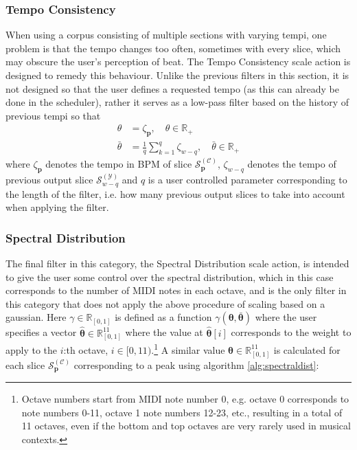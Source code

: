 \subsubsection{Tempo Consistency}
When using a corpus consisting of multiple sections with varying tempi, one problem is that the tempo changes too often, sometimes with every slice, which may obscure the user's perception of beat. The Tempo Consistency scale action is designed to remedy this behaviour. Unlike the previous filters in this section, it is not designed so that the user defines a requested tempo (as this can already be done in the scheduler), rather it serves as a low-pass filter based on the history of previous tempi so that
	\begin{align}
		\theta &= \zeta_{\bm p}, \quad \theta \in \mathbb R_+ \\
		\bar{\theta} &= \frac{1}{q}\sum_{k=1}^q \zeta_{w-q}, \quad \bar{\theta} \in \mathbb R_+
	\end{align} 
	where $\zeta_{\bm p}$ denotes the tempo in BPM of slice $\mathcal S^{(\mathcal C)}_{\bm p}$, $\zeta_{w-q}$ denotes the tempo of previous output slice $\mathcal S^{(\mathcal Y)}_{w-q}$ and $q$ is a user controlled parameter corresponding to the length of the filter, i.e. how many previous output slices to take into account when applying the filter. 

\subsubsection{Spectral Distribution}
The final filter in this category, the Spectral Distribution scale action, is intended to give the user some control over the spectral distribution, which in this case corresponds to the number of MIDI notes in each octave, and is the only filter in this category that does not apply the above procedure of scaling based on a gaussian. Here $\gamma \in \mathbb R_{[0,1]}$ is defined as a function $\gamma \left( \bm{\theta}, \bm{\bar \theta}\right)$ where the user specifies a vector $\bm{\hat \theta} \in \mathbb R^{11}_{[0,1]}$ where the value at $\bm{\hat\theta}[i]$ corresponds to the weight to apply to the $i$:th octave, $i \in [0, 11)$.\footnote{Octave numbers start from MIDI note number 0, e.g. octave 0 corresponds to note numbers 0-11, octave 1 note numbers 12-23, etc., resulting in a total of 11 octaves, even if the bottom and top octaves are very rarely used in musical contexts.} A similar value $\bm{\theta} \in \mathbb R^{11}_{[0,1]}$ is calculated for each slice $\mathcal S^{(\mathcal C)}_{\bm p}$ corresponding to a peak using algorithm \ref{alg:spectraldist}:

